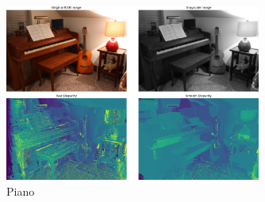 \documentclass{article}
\begin{document}
\begin{figure}[h]
    \centering
    \includegraphics[width=0.75\textwidth]{piano.png} %
    \caption*{Piano} %
\end{figure}
\end{document}
